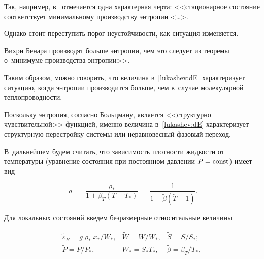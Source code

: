 Так, например, в~\cite[с.~60]{lukashev:bib52} отмечается одна характерная черта: <<стационарное состояние соответствует минимальному производству энтропии <\ldots>. 

Однако стоит переступить порог неустойчивости, как ситуация изменяется. 

Вихри Бенара производят больше энтропии, чем это следует из теоремы о~минимуме производства энтропии>>.

Таким образом, можно говорить, что величина в~\eqref{lukashev:dE} характеризует ситуацию, когда энтропии производится больше, чем в~случае молекулярной теплопроводности. 

Поскольку энтропия, согласно Больцману, является <<структурно чувствительной>> функцией, именно величина в~\eqref{lukashev:dE} характеризует структурную перестройку системы или неравновесный фазовый переход.



В~дальнейшем будем считать, что зависимость плотности жидкости от температуры (уравнение состояния при постоянном давлении $P={\rm const}$) имеет вид

\begin{equation}

\varrho=\frac{\varrho_*}{1+\beta_T (T-T_*)}=\frac{1}{1+\widetilde{\beta}( \widetilde{T}-1)}. 

\label{lukashev:NN1}

\end{equation}

Для локальных состояний введем безразмерные относительные величины

\begin{equation}

\begin{array}{ccc}

\widetilde{\varepsilon}_B=g\varrho_*x_*/W_*,

&

\widetilde{W}=W/W_*,

&

\widetilde{S}=S/S_*;\\

\widetilde{P}=P/P_*, 

&

W_*=S_*T_*, 

&

\widetilde{\beta}=\beta_T/T_*, 

\end{array}

\label{lukashev:odnSost}

\end{equation}

